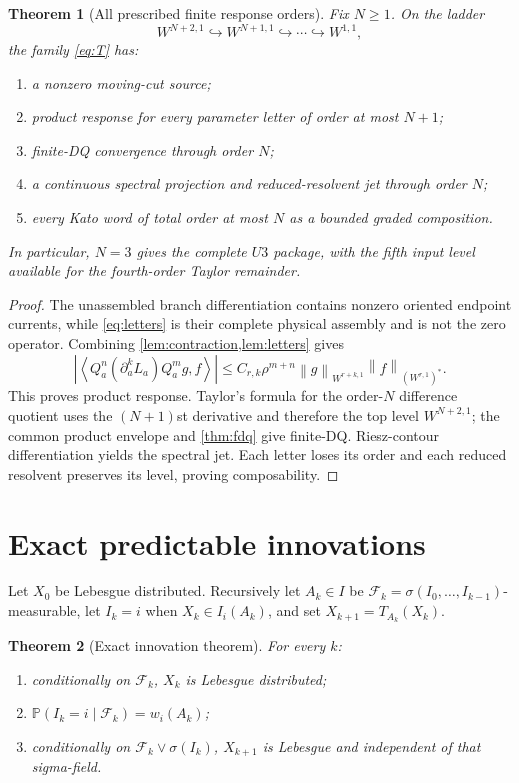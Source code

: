 \documentclass[11pt,reqno]{amsart}
\newtheorem{theorem}{Theorem}[section]
\theoremstyle{definition}
\theoremstyle{remark}
\newcommand{\F}{\mathcal F}
\newcommand{\Pp}{\mathbb P}
\newcommand{\norm}[1]{\left\lVert #1\right\rVert}
\newcommand{\abs}[1]{\left\lvert #1\right\rvert}
\newcommand{\pair}[2]{\left\langle #1,#2\right\rangle}
\begin{document}
\begin{theorem}[All prescribed finite response orders]\label{thm:allorder}
Fix $N\ge1$.  On the ladder
\[
 W^{N+2,1}\hookrightarrow W^{N+1,1}\hookrightarrow\cdots
 \hookrightarrow W^{1,1},
\]
the family \eqref{eq:T} has:
\begin{enumerate}[label=(\roman*)]
\item a nonzero moving-cut source;
\item product response for every parameter letter of order at most $N+1$;
\item finite-DQ convergence through order $N$;
\item a continuous spectral projection and reduced-resolvent jet through order
$N$;
\item every Kato word of total order at most $N$ as a bounded graded
composition.
\end{enumerate}
In particular, $N=3$ gives the complete $U3$ package, with the fifth input
level available for the fourth-order Taylor remainder.
\end{theorem}

\begin{proof}
The unassembled branch differentiation contains nonzero oriented endpoint
currents, while \eqref{eq:letters} is their complete physical assembly and is
not the zero operator.  Combining \cref{lem:contraction,lem:letters} gives
\[
 \abs{\pair{Q_a^n(\partial_a^kL_a)Q_a^mg}{f}}
 \le C_{r,k}\rho^{m+n}
 \norm g_{W^{r+k,1}}\norm f_{(W^{r,1})^*}.
\]
This proves product response.  Taylor's formula for the order-$N$ difference
quotient uses the $(N+1)$st derivative and therefore the top level
$W^{N+2,1}$; the common product envelope and \cref{thm:fdq} give finite-DQ.
Riesz-contour differentiation yields the spectral jet.  Each letter loses its
order and each reduced resolvent preserves its level, proving composability.
\end{proof}

\section{Exact predictable innovations}\label{sec:innovations}
Let $X_0$ be Lebesgue distributed.  Recursively let $A_k\in I$ be
$\F_k=\sigma(I_0,\ldots,I_{k-1})$-measurable, let $I_k=i$ when
$X_k\in I_i(A_k)$, and set $X_{k+1}=T_{A_k}(X_k)$.

\begin{theorem}[Exact innovation theorem]\label{thm:innovations}
For every $k$:
\begin{enumerate}[label=(\roman*)]
\item conditionally on $\F_k$, $X_k$ is Lebesgue distributed;
\item $\Pp(I_k=i\mid\F_k)=w_i(A_k)$;
\item conditionally on $\F_k\vee\sigma(I_k)$, $X_{k+1}$ is Lebesgue
and independent of that sigma-field.
\end{enumerate}
\end{theorem}
\end{document}
